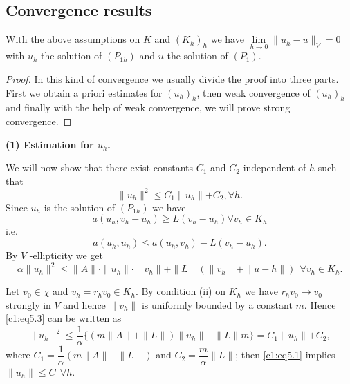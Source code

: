 \subsection{Convergence results}\label{c1:ss5.4}

\begin{theorem}\label{c1:thm5.2}%
With the above assumptions on $K$ and $(K_h)_h$ we have $\lim
\limits_{h \to 0} \parallel u_h - u \parallel_V = 0$ with $u_h$ the
solution of $(P_{1h})$ and $u$ the solution of $(P_1)$. 
\end{theorem}

\begin{proof}
In this kind of convergence we usually divide the proof into three
parts. First we obtain a priori estimates for $(u_h)_h$, then weak
convergence of $(u_h)_h$ and finally with the help of weak
convergence, we will prove strong convergence. 
\end{proof}

\noindent\textbf{(1) Estimation for $u_h$.}

We will now show that there exist constants $C_1$ and $C_2$
independent of $h$ such that  
\begin{equation}
\parallel u_h \parallel^2 \leq C_1 \parallel u_h \parallel + C_2,
\forall h. \tag{5.1}\label{c1:eq5.1} 
\end{equation}
Since $u_h$ is the solution of $(P_{1h})$ we have
\begin{equation}
a(u_h, v_h - u_h) \geq L(v_h - u_h) 
\forall v_h \in K_h \tag{5.2}\label{c1:eq5.2} 
\end{equation}
i.e.
$$
a(u_h, u_h) \leq a(u_h, v_h) - L(v_h - u_h).
$$
By $V$ -ellipticity we get 
\begin{equation}
\alpha \parallel u_h \parallel^2 \leq \parallel A \parallel \cdot
\parallel u_h \parallel \cdot \parallel v_h \parallel + \parallel L
\parallel (\parallel v_h \parallel + \parallel u-h \parallel )~~
\forall v_h \in K_h. \tag{5.3}\label{c1:eq5.3} 
\end{equation}

Let $v_0 \in \chi$ and $v_h = r_h v_0 \in K_h$. By condition
(ii) on $K_h$ we have $r_h v_0 \to v_0$ strongly in $V$ and hence
$\parallel v_h \parallel$ is uniformly bounded by a constant
$m$. Hence \eqref{c1:eq5.3} can be written as  
$$
\parallel u_h \parallel^2 \leq \frac{1}{\alpha} \{(m \parallel A
\parallel + \parallel L\parallel ) \parallel u_h \parallel + \parallel
L \parallel m\} = C_1 \parallel u_h \parallel + C_2, 
$$\pageoriginale
where $C_1 = \dfrac{1}{\alpha}(m \parallel A \parallel + \parallel L
\parallel)$ and $C_2 = \dfrac{m}{\alpha} \parallel L \parallel$; then
\eqref{c1:eq5.1} implies $\parallel u_h \parallel \leq C ~~ \forall h$.  

